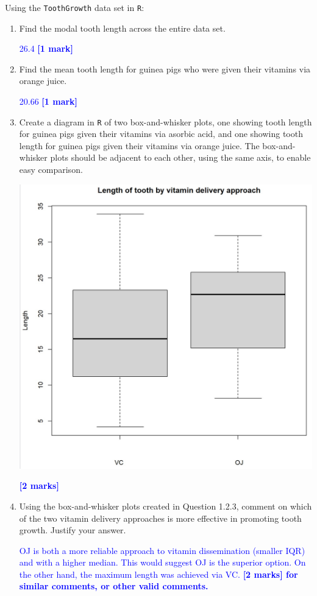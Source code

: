\documentclass[11pt,a4paper]{article}
\begin{document}
\begin{question}
Using the \texttt{ToothGrowth} data set in \texttt{R}:
\begin{enumerate}
\item Find the modal tooth length across the entire data set.

\textcolor{blue}{26.4 \textbf{[1 mark]}}
\item Find the mean tooth length for guinea pigs who were given their vitamins via orange juice.



\textcolor{blue}{20.66 \textbf{[1 mark]}}

\item Create a diagram in \texttt{R} of two box-and-whisker plots, one showing tooth length for guinea pigs given their vitamins via asorbic acid, and one showing tooth length for guinea pigs given their vitamins via orange juice. The box-and-whisker plots should be adjacent to each other, using the same axis, to enable easy comparison.

\includegraphics[scale=0.7]{ISDSA1p1.jpg}

\textcolor{blue}{\textbf{[2 marks]}}

\item Using the box-and-whisker plots created in Question 1.2.3, comment on which of the two vitamin delivery approaches is more effective in promoting tooth growth. Justify your answer.

\textcolor{blue}{OJ is both a more reliable approach to vitamin dissemination (smaller IQR) and with a higher median. This would suggest OJ is the superior option. On the other hand, the maximum length was achieved via VC. \textbf{[2 marks] for similar comments, or other valid comments.}}

\end{enumerate}

\end{question}
\end{document}
